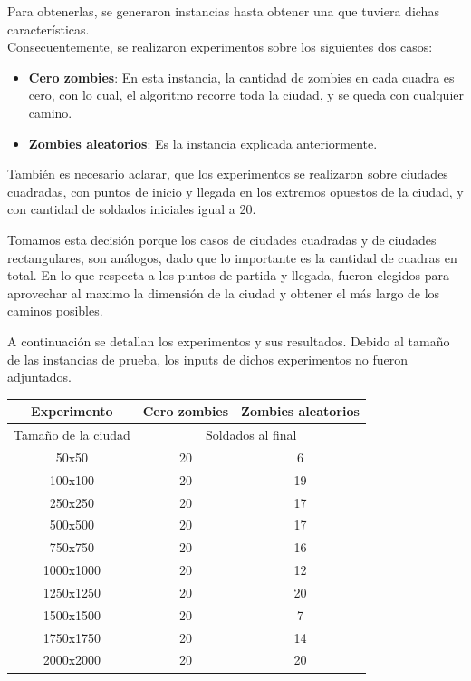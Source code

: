 Para obtenerlas, se generaron instancias hasta obtener una que tuviera dichas características.\\

Consecuentemente, se realizaron experimentos sobre los siguientes dos casos:
\begin{itemize}
	\item \textbf{Cero zombies}: En esta instancia, la cantidad de zombies en cada cuadra es cero, con lo cual, el algoritmo recorre toda la ciudad, y se queda con cualquier camino.
	\item \textbf{Zombies aleatorios}: Es la instancia explicada anteriormente.
\end{itemize}

También es necesario aclarar, que los experimentos se realizaron sobre ciudades cuadradas, con puntos de inicio y llegada en los extremos opuestos de la ciudad, y con cantidad de soldados iniciales igual a 20. 

Tomamos esta decisi\'on porque los casos de ciudades cuadradas y de ciudades rectangulares, son análogos, dado que lo importante es la cantidad de cuadras en total. En lo que respecta a los puntos de partida y llegada, fueron elegidos para aprovechar al maximo la dimensi\'on de la ciudad y obtener el más largo de los caminos posibles.\\

\newpage

A continuación se detallan los experimentos y sus resultados.
Debido al tamaño de las instancias de prueba, los inputs de dichos experimentos no fueron adjuntados.
\begin{center}
	\begin{tabular}{|c|c|c|}
	\hline
	Experimento & \textbf{Cero zombies} & \textbf{Zombies aleatorios}\\
	\hline
	\hline
	Tamaño de la ciudad & \multicolumn{2}{|c|}{Soldados al final}\\
	\hline
	50x50 & 20 & 6\\
	\hline
	100x100 & 20 & 19\\
	\hline
	250x250 & 20 & 17\\
	\hline
	500x500 & 20 & 17\\
	\hline
	750x750 & 20 & 16\\
	\hline
	1000x1000 & 20 & 12\\
	\hline
	1250x1250 & 20 & 20\\
	\hline
	1500x1500 & 20 & 7\\
	\hline
	1750x1750 & 20 & 14\\
	\hline
	2000x2000 & 20 & 20\\
	\hline
	\end{tabular}
\end{center}



